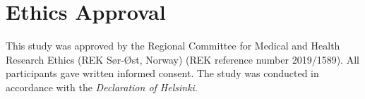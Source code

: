 \section{Ethics Approval}\label{app:ethics}

This study was approved by the Regional Committee for Medical and Health Research Ethics (REK Sør-Øst, Norway) (REK reference number 2019/1589). All participants gave written informed consent. The study was conducted in accordance with the \textit{Declaration of Helsinki}.
